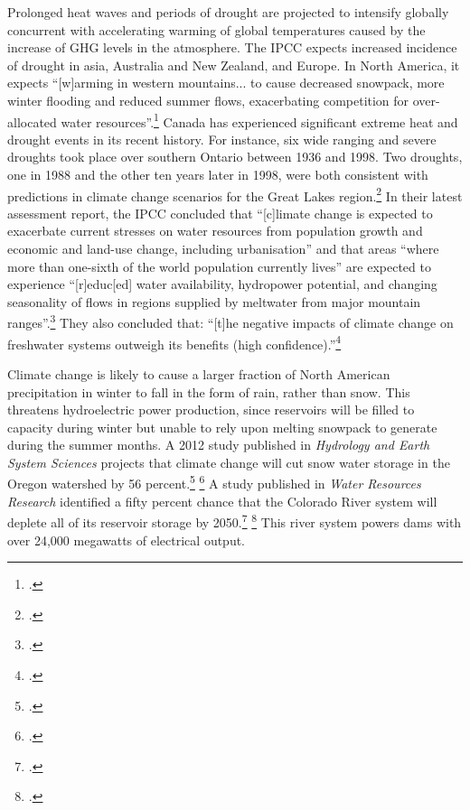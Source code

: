 Prolonged heat waves and periods of drought are projected to intensify globally concurrent with accelerating warming of global temperatures caused by the increase of GHG levels in the atmosphere.
The IPCC expects increased incidence of drought in asia, Australia and New Zealand, and Europe.
In North America, it expects ``[w]arming in western mountains... to cause decreased snowpack, more winter flooding and reduced summer flows, exacerbating competition for over-allocated water resources''.\footcite[][See: Synthesis report, Table SPM.2. Examples of some projected regional impacts. \url{https://www.ipcc.ch/publications_and_data/ar4/syr/en/spms3.html}]{IPCC2007}
Canada has experienced significant extreme heat and drought events in its recent history. 
For instance, six wide ranging and severe droughts took place over southern Ontario between 1936 and 1998. 
Two droughts, one in 1988 and the other ten years later in 1998, were both consistent with predictions in climate change scenarios for the Great Lakes region.\footcite[][]{Koshida2005}
In their latest assessment report, the IPCC concluded that ``[c]limate change is expected to exacerbate current stresses on water resources from population growth and economic and land-use change, including urbanisation'' and that areas ``where more than one-sixth of the world population currently lives'' are expected to experience ``[r]educ[ed] water availability, hydropower potential, and changing seasonality of flows in regions supplied by meltwater from major mountain ranges''.\footcite[][p. 49]{IPCCar4_syr}
They also concluded that: ``[t]he negative impacts of climate change on freshwater systems outweigh its benefits (high confidence).''\footcite[][p. 49]{IPCCar4_syr}



Climate change is likely to cause a larger fraction of North American precipitation in winter to fall in the form of rain, rather than snow.
This threatens hydroelectric power production, since reservoirs will be filled to capacity during winter but unable to rely upon melting snowpack to generate during the summer months.
A 2012 study published in \emph{Hydrology and Earth System Sciences} projects that climate change will cut snow water storage in the Oregon watershed by 56 percent.\footcite[][]{Sproles2012} \footcite[][]{OregonSnowpack}
A study published in \emph{Water Resources Research} identified a fifty percent chance that the Colorado River system will deplete all of its reservoir storage by 2050.\footcite[][]{ColoradoReservoirs} \footcite[See also: ][]{DryingWest2011}
This river system powers dams with over 24,000 megawatts of electrical output.



